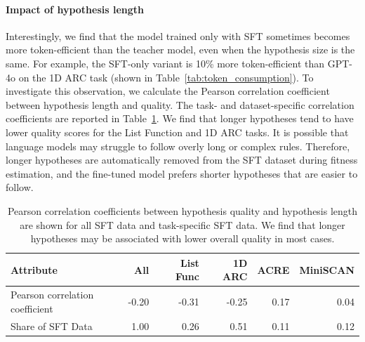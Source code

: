 \paragraph{Impact of hypothesis length} Interestingly, we find that the \proposed model trained only with SFT sometimes becomes more token-efficient than the teacher model, even when the hypothesis size is the same. For example, the SFT-only variant is 10\% more token-efficient than GPT-4o on the 1D ARC task (shown in Table~\ref{tab:token_consumption}). To investigate this observation, we calculate the Pearson correlation coefficient between hypothesis length and quality. The task- and dataset-specific correlation coefficients are reported in Table~\ref{tab:hypo_len}. We find that longer hypotheses tend to have lower quality scores for the List Function and 1D ARC tasks. It is possible that language models may struggle to follow overly long or complex rules. Therefore, longer hypotheses are automatically removed from the SFT dataset during fitness estimation, and the fine-tuned model prefers shorter hypotheses that are easier to follow.

\begin{table}
\small
\centering
\begin{tabular}{lrrrrr}
\toprule
Attribute & All & List Func & 1D ARC & ACRE & MiniSCAN \\ \midrule
Pearson correlation coefficient & -0.20 & -0.31 & -0.25 & 0.17 & 0.04 \\
Share of SFT Data & 1.00 & 0.26 & 0.51 & 0.11 & 0.12 \\ \bottomrule
\end{tabular}
\caption{Pearson correlation coefficients between hypothesis quality and hypothesis length are shown for all SFT data and task-specific SFT data. We find that longer hypotheses may be associated with lower overall quality in most cases.}
\label{tab:hypo_len}
\end{table}

\begin{table}
\caption{Ablation Study for \proposed-Llama, for hypothesis size of $10$.}
\label{tab:ablation}
\end{table}

